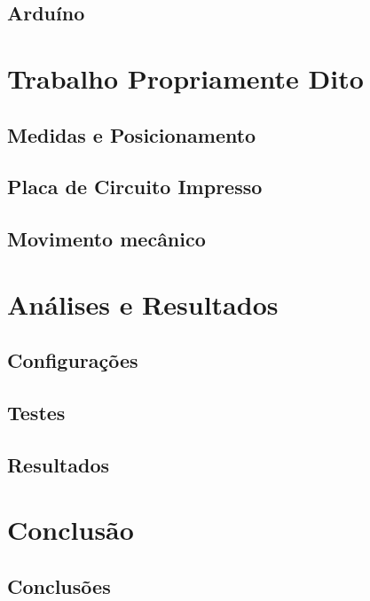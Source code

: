 \documentclass{../ufpatcc}
\begin{document}
		\section{Arduíno}


	\chapter{Trabalho Propriamente Dito}
	
		\section{Medidas e Posicionamento}

		\section{Placa de Circuito Impresso}
		
		\section{Movimento mecânico}


	\chapter{Análises e Resultados}

		\section{Configurações}

		\section{Testes}

		\section{Resultados}
		

  \chapter{Conclusão}

		\section{Conclusões}
\end{document}
